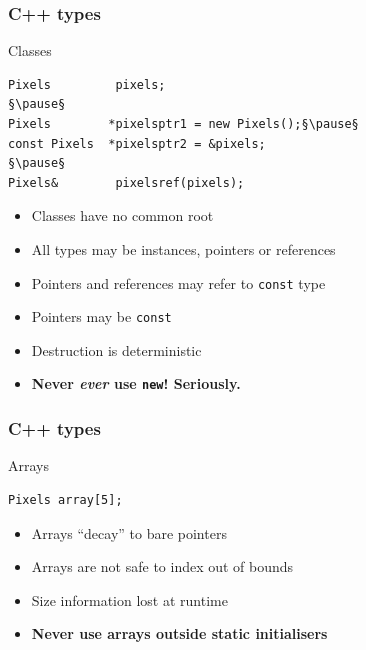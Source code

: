 \documentclass[handout]{beamer}
\begin{document}
\begin{frame}[fragile]
  \frametitle{C++ types}
  \begin{block}{Classes}
  \begin{lstlisting}
Pixels         pixels;
§\pause§
Pixels        *pixelsptr1 = new Pixels();§\pause§
const Pixels  *pixelsptr2 = &pixels;
§\pause§
Pixels&        pixelsref(pixels);
\end{lstlisting}
  \begin{itemize}
    \pause
  \item Classes have no common root
    \pause
  \item All types may be instances, pointers or references
    \pause
  \item Pointers and references may refer to \texttt{const} type
    \pause
  \item Pointers may be \texttt{const}
    \pause
  \item Destruction is deterministic
    \pause
  \item \textbf{Never \emph{ever} use \texttt{new}!  Seriously.}
  \end{itemize}
  \end{block}
\end{frame}

\begin{frame}[fragile]
  \frametitle{C++ types}
  \begin{block}{Arrays}
  \begin{lstlisting}
Pixels array[5];
\end{lstlisting}
  \begin{itemize}
    \pause
  \item Arrays “decay” to bare pointers
    \pause
  \item Arrays are not safe to index out of bounds
    \pause
  \item Size information lost at runtime
    \pause
  \item \textbf{Never use arrays outside static initialisers}
  \end{itemize}
  \end{block}
\end{frame}
\end{document}
